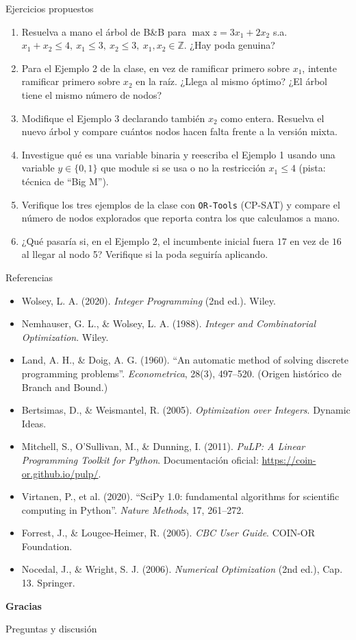 \documentclass[aspectratio=169]{beamer}
\begin{document}
\begin{frame}{Ejercicios propuestos}
\small
\begin{enumerate}
\setlength{\itemsep}{2pt}
\item Resuelva a mano el árbol de B\&B para $\max z=3x_1+2x_2$ s.a. $x_1+x_2\leq4,\ x_1\leq3,\ x_2\leq3,\ x_1,x_2\in\mathbb{Z}$. ¿Hay poda genuina?
\item Para el Ejemplo 2 de la clase, en vez de ramificar primero sobre $x_1$, intente ramificar primero sobre $x_2$ en la raíz. ¿Llega al mismo óptimo? ¿El árbol tiene el mismo número de nodos?
\item Modifique el Ejemplo 3 declarando también $x_2$ como entera. Resuelva el nuevo árbol y compare cuántos nodos hacen falta frente a la versión mixta.
\item Investigue qué es una variable binaria y reescriba el Ejemplo 1 usando una variable $y\in\{0,1\}$ que module si se usa o no la restricción $x_1\leq4$ (pista: técnica de ``Big M'').
\item Verifique los tres ejemplos de la clase con \texttt{OR-Tools} (CP-SAT) y compare el número de nodos explorados que reporta contra los que calculamos a mano.
\item ¿Qué pasaría si, en el Ejemplo 2, el incumbente inicial fuera $17$ en vez de $16$ al llegar al nodo 5? Verifique si la poda seguiría aplicando.
\end{enumerate}
\end{frame}

\begin{frame}{Referencias}
\small
\begin{itemize}
\setlength{\itemsep}{1pt}
\item Wolsey, L. A. (2020). \emph{Integer Programming} (2nd ed.). Wiley.
\item Nemhauser, G. L., \& Wolsey, L. A. (1988). \emph{Integer and Combinatorial Optimization}. Wiley.
\item Land, A. H., \& Doig, A. G. (1960). ``An automatic method of solving discrete programming problems''. \emph{Econometrica}, 28(3), 497--520. (Origen histórico de Branch and Bound.)
\item Bertsimas, D., \& Weismantel, R. (2005). \emph{Optimization over Integers}. Dynamic Ideas.
\item Mitchell, S., O'Sullivan, M., \& Dunning, I. (2011). \emph{PuLP: A Linear Programming Toolkit for Python}. Documentación oficial: \url{https://coin-or.github.io/pulp/}.
\item Virtanen, P., et al. (2020). ``SciPy 1.0: fundamental algorithms for scientific computing in Python''. \emph{Nature Methods}, 17, 261--272.
\item Forrest, J., \& Lougee-Heimer, R. (2005). \emph{CBC User Guide}. COIN-OR Foundation.
\item Nocedal, J., \& Wright, S. J. (2006). \emph{Numerical Optimization} (2nd ed.), Cap. 13. Springer.
\end{itemize}
\end{frame}

\begin{frame}{}
\centering
{\Large\textbf{Gracias}}

\vspace{0.4cm}
\normalsize Preguntas y discusión
\end{frame}
\end{document}
